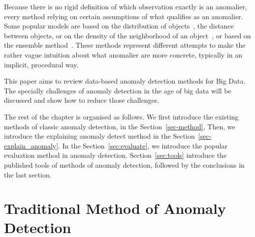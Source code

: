 Because there is no rigid definition of which
observation exactly is an anomalier,
every method relying on certain assumptions of
what qualifies as an anomalier.
Some popular models are based on
the distribution of
objects~\cite{siripanadorn2010anomaly,chandola2009anomaly,kromanis2013support},
the distance~\cite{knorr1997unified}
between objects,
or on the density of
the neighborhood of
an object~\cite{agyemang2004algorithm,breunig2000lof,papadimitriou2003loci},
or based on the ensemble method~\cite{zhou2012ensemble}.
These methods represent different attempts to make
the rather vague intuition about
what anomalier are more concrete,
typically in an implicit,
procedural way.

This paper aims to review data-based
anomaly detection methods for Big Data.
The specially challenges of anomaly detection
in the age of big data will be discussed and
show how to reduce those challenges.


The rest of the chapter is organised as follows.
We first introduce the existing methods of classic anomaly detection,
in the Section~\ref{sec-method},
Then,
we introduce the explaining anomaly detect method
in the Section~\ref{sec-explain_anomaly}.
In the Section~\ref{sec:evaluate},
we introduce the popular evaluation method in anomaly detection.
Section~\ref{sec:tools} introduce the published tools of
methods of anomaly detection,
followed by the conclusions in the last section.

\section{Traditional Method of Anomaly Detection}~\label{sec-method}

